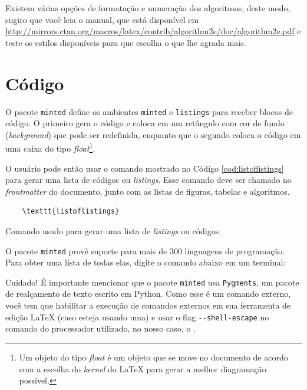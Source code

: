 Existem várias opções de formatação e numeração dos algoritmos, deste modo, sugiro que você leia o manual, que está disponível em \url{http://mirrors.ctan.org/macros/latex/contrib/algorithm2e/doc/algorithm2e.pdf} \parencite{algorithm2e} e teste os estilos disponíveis para que escolha o que lhe agrada mais.

\section{Código}\label{sec:codigo}

O pacote \texttt{minted} define os ambientes \texttt{minted} e \texttt{listings} para receber blocos de código. O primeiro gera o código e coloca em um retângulo com cor de fundo (\textit{background}) que pode ser redefinida, enquanto que o segundo coloca o código em uma caixa do tipo \textit{float}\footnote{Um objeto do tipo \textit{float} é um objeto que se move no documento de acordo com a escolha do \textit{kernel} do \LaTeX{} para gerar a melhor diagramação possível.}.

O usuário pode então usar o comando mostrado no Código \ref{cod:listoflistings} para gerar uma lista de códigos ou \textit{listings}. Esse comando deve ser chamado no \textit{frontmatter} do documento, junto com as listas de figuras, tabelas e algoritmos.

\begin{listing}[ht]
	\begin{verbatim}
	\texttt{listoflistings}	
	\end{verbatim}
\caption{Comando usado para gerar uma lista de \textit{listings} ou códigos.}
\label{cod:listoflistings}
\end{listing}

O pacote \texttt{minted}\index{} provê suporte para mais de 300 linguagens de programação. Para obter uma lista de todas elas, digite o comando abaixo em um terminal:


\begin{bclogo}[
	couleur=bgblue,
	arrondi=0,
	logo=\faWarning,%
	barre=none,
	noborder=true]{Cuidado!}
	É importante mencionar que o pacote \texttt{minted} usa \texttt{Pygments}, um pacote de realçamento de texto escrito em Python. Como esse é um comando externo, você tem que habilitar a execução de comandos externos em sua ferramenta de edição \LaTeX{} (caso esteja usando uma) e usar o flag \texttt{-}\texttt{-shell-escape} no comando do processador utilizado, no nosso caso, o .
\end{bclogo}


